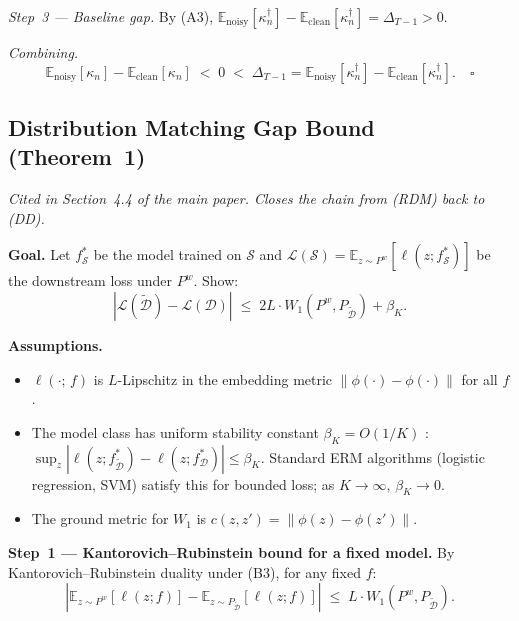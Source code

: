 \documentclass[runningheads]{llncs}
\begin{document}
\textit{Step~3 --- Baseline gap.}
By (A3), $\mathbb{E}_\text{noisy}[\kappa^\dagger_n] - \mathbb{E}_\text{clean}[\kappa^\dagger_n] = \Delta_{T-1} > 0$.

\textit{Combining.}
\begin{equation}
    \mathbb{E}_\text{noisy}[\kappa_n] - \mathbb{E}_\text{clean}[\kappa_n]
    \;<\; 0
    \;<\; \Delta_{T-1}
    = \mathbb{E}_\text{noisy}[\kappa^\dagger_n] - \mathbb{E}_\text{clean}[\kappa^\dagger_n].
    \quad \square
\end{equation}

\subsection{Distribution Matching Gap Bound (Theorem~1)}
\label{app:proof-gap}

\textit{Cited in Section~4.4 of the main paper. Closes the chain from (RDM) back to (DD).}

\textbf{Goal.}
Let $f^*_\mathcal{S}$ be the model trained on $\mathcal{S}$ and $\mathcal{L}(\mathcal{S}) = \mathbb{E}_{z \sim P^w}[\ell(z; f^*_\mathcal{S})]$ be the downstream loss under $P^w$. Show:
\begin{equation}
    |\mathcal{L}(\tilde{\mathcal{D}}) - \mathcal{L}(\mathcal{D})|
    \;\leq\; 2L \cdot W_1(P^w, P_{\tilde{\mathcal{D}}}) + \beta_K.
\end{equation}

\textbf{Assumptions.}
\begin{itemize}
    \item[\textbf{(B1)}] $\ell(\cdot;\,f)$ is $L$-Lipschitz in the embedding metric $\|\phi(\cdot) - \phi(\cdot)\|$ for all $f$.
    \item[\textbf{(B2)}] The model class has uniform stability constant $\beta_K = O(1/K)$ \cite{bousquet2002stability}: $\sup_z |\ell(z; f^*_{\tilde{\mathcal{D}}}) - \ell(z; f^*_\mathcal{D})| \leq \beta_K$. Standard ERM algorithms (logistic regression, SVM) satisfy this for bounded loss; as $K \to \infty$, $\beta_K \to 0$.
    \item[\textbf{(B3)}] The ground metric for $W_1$ is $c(z,z') = \|\phi(z) - \phi(z')\|$.
\end{itemize}

\textbf{Step~1 --- Kantorovich--Rubinstein bound for a fixed model.}
By Kantorovich--Rubinstein duality \cite{villani2008optimal} under (B3), for any fixed $f$:
\begin{equation}
    \left|
        \mathbb{E}_{z \sim P^w}[\ell(z; f)]
        - \mathbb{E}_{z \sim P_{\tilde{\mathcal{D}}}}[\ell(z; f)]
    \right|
    \;\leq\; L \cdot W_1(P^w, P_{\tilde{\mathcal{D}}}).
\end{equation}
\end{document}
